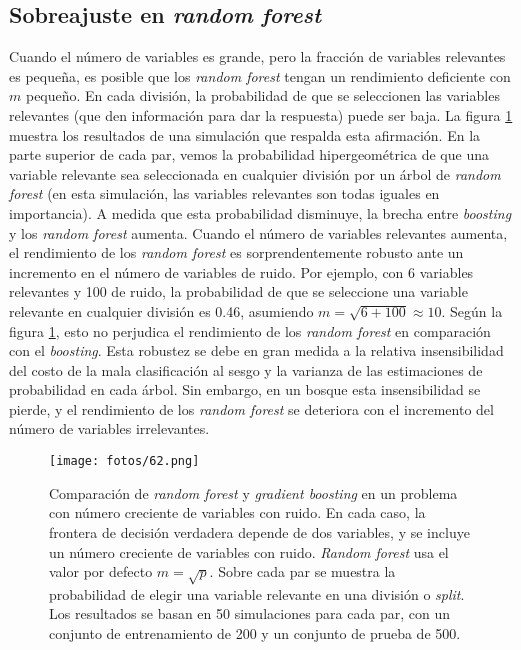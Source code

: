 \subsection{Sobreajuste en \textit{random forest}}

Cuando el número de variables es grande, pero la fracción de variables relevantes es pequeña, es posible que los \textit{random forest} tengan un rendimiento deficiente con $m$ pequeño. En cada división, la probabilidad de que se seleccionen las variables relevantes (que den información para dar la respuesta) puede ser baja. La figura \ref{fig:20.7} muestra los resultados de una simulación que respalda esta afirmación. En la parte superior de cada par, vemos la probabilidad hipergeométrica de que una variable relevante sea seleccionada en cualquier división por un árbol de \textit{random forest} (en esta simulación, las variables relevantes son todas iguales en importancia). A medida que esta probabilidad disminuye, la brecha entre \textit{boosting} y los \textit{random forest} aumenta. Cuando el número de variables relevantes aumenta, el rendimiento de los \textit{random forest} es sorprendentemente robusto ante un incremento en el número de variables de ruido. Por ejemplo, con 6 variables relevantes y 100 de ruido, la probabilidad de que se seleccione una variable relevante en cualquier división es 0.46, asumiendo $m = \sqrt{6 + 100} \approx 10$. Según la figura \ref{fig:20.7}, esto no perjudica el rendimiento de los \textit{random forest} en comparación con el \textit{boosting}. Esta robustez se debe en gran medida a la relativa insensibilidad del costo de la mala clasificación al sesgo y la varianza de las estimaciones de probabilidad en cada árbol. Sin embargo, en un bosque esta insensibilidad se pierde, y el rendimiento de los \textit{random forest} se deteriora con el incremento del número de variables irrelevantes. \\

\begin{figure}[H]
\centering
\texttt{[image: fotos/62.png]}
\caption{Comparación de \textit{random forest} y \textit{gradient boosting} en un problema con número creciente de variables con ruido. En cada caso, la frontera de decisión verdadera depende de dos variables, y se incluye un número creciente de variables con ruido. \textit{Random forest} usa el valor por defecto $m = \sqrt{p}$. Sobre cada par se muestra la probabilidad de elegir una variable relevante en una división o \textit{split}. Los resultados se basan en 50 simulaciones para cada par, con un conjunto de entrenamiento de 200 y un conjunto de prueba de 500.}
\label{fig:20.7}
\end{figure}

